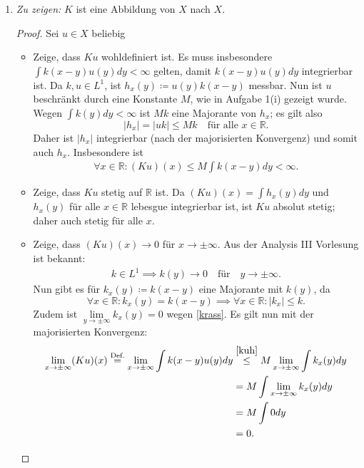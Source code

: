 \documentclass[a4paper]{article}
\theoremstyle{plain}
\begin{document}
\begin{enumerate}[label=(\roman*)]
	\item \textit{Zu zeigen:} $K$ ist eine Abbildung von $X$ nach $X$.
	\begin{proof}
		Sei $u \in X$ beliebig
		\begin{itemize}
			\item Zeige, dass $Ku$ wohldefiniert ist. Es muss insbesondere $\int k(x-y)u(y)dy < \infty$ gelten, damit $k(x-y)u(y)dy$ integrierbar ist. Da $k,u \in L^1$, ist $h_x(y) \coloneqq u(y)k(x-y)$ messbar. Nun ist $u$ beschränkt durch eine Konstante $M$, wie in Aufgabe 1(i) gezeigt wurde. Wegen $\int k(y)dy < \infty$ ist $Mk$ eine Majorante von $h_x$; es gilt also
			\[
				|h_x| = |uk| \leq Mk \quad \text{für alle $x \in \mathbb R$}.
			\]
			Daher ist $|h_x|$ integrierbar (nach der majorisierten Konvergenz) und somit auch $h_x$. Insbesondere ist 
			\begin{align}\label{kuh}
				\forall x \in \mathbb R: (Ku)(x) \leq M \int k(x-y)dy < \infty.
			\end{align}
			
			\item Zeige, dass $Ku$ stetig auf $\mathbb R$ ist. Da $(Ku)(x) = \int h_x(y)dy$ und $h_x(y)$ für alle $x \in \mathbb R$ lebesgue integrierbar ist, ist $Ku$ absolut stetig; daher auch stetig für alle $x$.
			
			\item Zeige, dass $(Ku)(x) \to 0$ für $x \to \pm\infty$. Aus der Analysis III Vorlesung ist bekannt: 
			\begin{align}\label{krass}
				k \in L^1 \implies k(y) \to 0 \quad \text{für} \quad y \to \pm \infty.
			\end{align}
			Nun gibt es für $k_x(y) \coloneqq k(x-y)$ eine Majorante mit $k(y)$, da 
			\[
				\forall x\in \mathbb R: k_x(y) = k(x-y) \implies \forall x\in \mathbb R: |k_x| \leq k.
			\]
			Zudem ist $\lim\limits_{y \to \pm \infty}k_x(y) = 0$ wegen \eqref{krass}. Es gilt nun mit der majorisierten Konvergenz:
			\begin{align*}
				\lim_{x \to \pm \infty} (Ku)(x) \overset{\text{Def.}}{=} \lim_{x \to \pm \infty} \int k(x-y)u(y) dy &\overset{\eqref{kuh}}{\leq} M \lim_{x \to \pm \infty} \int k_x(y)dy\\
				&= M \int  \lim_{x \to \pm \infty} k_x(y)dy \\
				&= M \int 0 dy \\
				&= 0.
			\end{align*}
		\end{itemize}
	\end{proof}


\end{enumerate}
\end{document}
